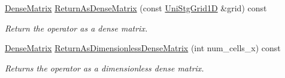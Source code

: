 \begin{DoxyCompactItemize}
\hyperlink{classmtk_1_1DenseMatrix}{Dense\+Matrix} \hyperlink{classmtk_1_1Div1D_a213fddbaaf86e4840c6a9649b69c2d49}{Return\+As\+Dense\+Matrix} (const \hyperlink{classmtk_1_1UniStgGrid1D}{Uni\+Stg\+Grid1\+D} \&grid) const 
\begin{DoxyCompactList}\small\item\em Return the operator as a dense matrix. \end{DoxyCompactList}\item 
\hyperlink{classmtk_1_1DenseMatrix}{Dense\+Matrix} \hyperlink{classmtk_1_1Div1D_af2546ad1568ef39a6075f03bb395719e}{Return\+As\+Dimensionless\+Dense\+Matrix} (int num\+\_\+cells\+\_\+x) const 
\begin{DoxyCompactList}\small\item\em Returns the operator as a dimensionless dense matrix. \end{DoxyCompactList}\end{DoxyCompactItemize}
